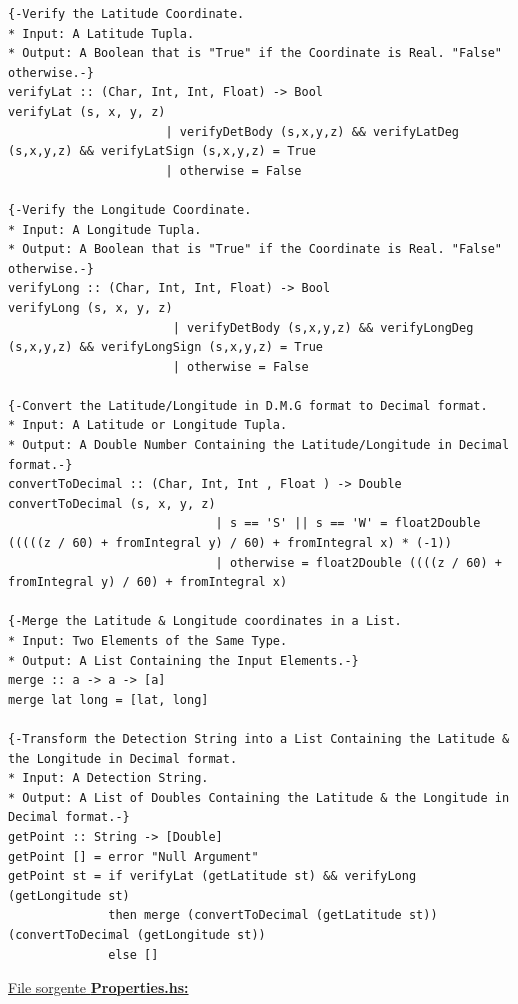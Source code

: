 \documentclass{article}
\begin{document}
\begin{lstlisting}
{-Verify the Latitude Coordinate.
* Input: A Latitude Tupla.
* Output: A Boolean that is "True" if the Coordinate is Real. "False" otherwise.-}
verifyLat :: (Char, Int, Int, Float) -> Bool 
verifyLat (s, x, y, z)  
                      | verifyDetBody (s,x,y,z) && verifyLatDeg (s,x,y,z) && verifyLatSign (s,x,y,z) = True
                      | otherwise = False

{-Verify the Longitude Coordinate.
* Input: A Longitude Tupla.
* Output: A Boolean that is "True" if the Coordinate is Real. "False" otherwise.-}
verifyLong :: (Char, Int, Int, Float) -> Bool 
verifyLong (s, x, y, z)  
                       | verifyDetBody (s,x,y,z) && verifyLongDeg (s,x,y,z) && verifyLongSign (s,x,y,z) = True
                       | otherwise = False
                     
{-Convert the Latitude/Longitude in D.M.G format to Decimal format.
* Input: A Latitude or Longitude Tupla.
* Output: A Double Number Containing the Latitude/Longitude in Decimal format.-}
convertToDecimal :: (Char, Int, Int , Float ) -> Double  
convertToDecimal (s, x, y, z) 
                             | s == 'S' || s == 'W' = float2Double (((((z / 60) + fromIntegral y) / 60) + fromIntegral x) * (-1))
                             | otherwise = float2Double ((((z / 60) + fromIntegral y) / 60) + fromIntegral x)

{-Merge the Latitude & Longitude coordinates in a List.
* Input: Two Elements of the Same Type.
* Output: A List Containing the Input Elements.-}
merge :: a -> a -> [a]
merge lat long = [lat, long]

{-Transform the Detection String into a List Containing the Latitude & the Longitude in Decimal format.
* Input: A Detection String.
* Output: A List of Doubles Containing the Latitude & the Longitude in Decimal format.-}
getPoint :: String -> [Double]
getPoint [] = error "Null Argument"
getPoint st = if verifyLat (getLatitude st) && verifyLong (getLongitude st) 
              then merge (convertToDecimal (getLatitude st)) (convertToDecimal (getLongitude st))
              else []
\end{lstlisting}
\underline{File sorgente \textbf{Properties.hs:}}
\lstset{language=Haskell}
\end{document}
